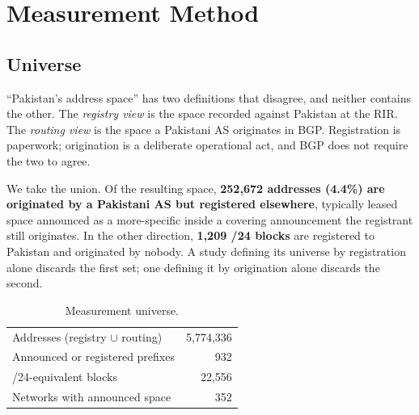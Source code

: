 %
%

\section{Measurement Method}
\label{sec:method}

\subsection{Universe}
\label{sec:universe}

``Pakistan's address space'' has two definitions that disagree, and neither contains the
other. The \emph{registry view} is the space recorded against Pakistan at the RIR. The
\emph{routing view} is the space a Pakistani AS originates in BGP. Registration is
paperwork; origination is a deliberate operational act, and BGP does not require the two
to agree.

We take the union. Of the resulting space, \textbf{252{,}672 addresses (4.4\%) are
originated by a Pakistani AS but registered elsewhere}, typically leased space announced
as a more-specific inside a covering announcement the registrant still originates. In the
other direction, \textbf{1{,}209 /24 blocks} are registered to Pakistan and originated by
nobody. A study defining its universe by registration alone discards the first set; one
defining it by origination alone discards the second.

\begin{table}[t]
\centering
\caption{Measurement universe.}
\label{tab:universe}
\begin{tabular}{lr}
\toprule
Addresses (registry $\cup$ routing) & 5{,}774{,}336 \\
Announced or registered prefixes    & 932 \\
/24-equivalent blocks               & 22{,}556 \\
Networks with announced space       & 352 \\
\bottomrule
\end{tabular}
\end{table}

